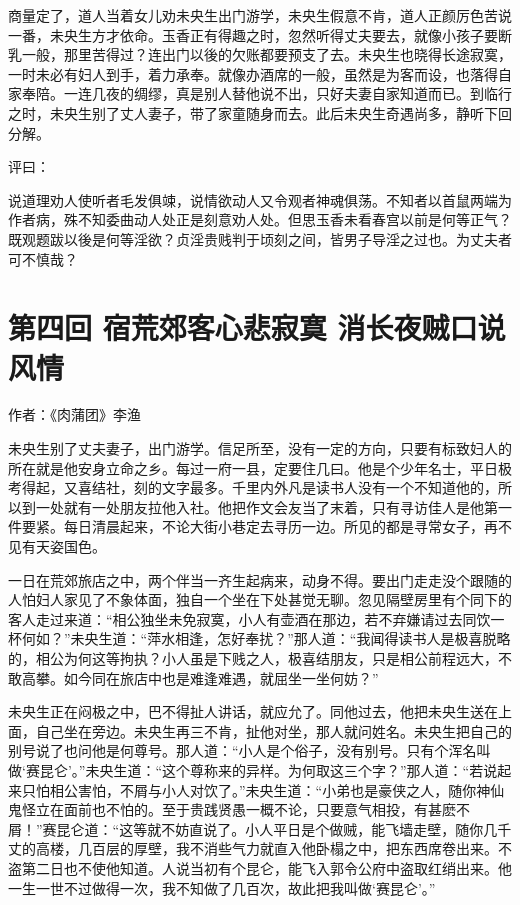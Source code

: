 \documentclass[a4paper,12pt,UTF8,twoside]{ctexbook}
\begin{document}
商量定了，道人当着女儿劝未央生出门游学，未央生假意不肯，道人正颜厉色苦说一番，未央生方才依命。玉香正有得趣之时，忽然听得丈夫要去，就像小孩子要断乳一般，那里苦得过？连出门以後的欠账都要预支了去。未央生也晓得长途寂寞，一时未必有妇人到手，着力承奉。就像办酒席的一般，虽然是为客而设，也落得自家奉陪。一连几夜的绸缪，真是别人替他说不出，只好夫妻自家知道而已。到临行之时，未央生别了丈人妻子，带了家童随身而去。此后未央生奇遇尚多，静听下回分解。

评曰：

说道理劝人使听者毛发俱竦，说情欲动人又令观者神魂俱荡。不知者以首鼠两端为作者病，殊不知委曲动人处正是刻意劝人处。但思玉香未看春宫以前是何等正气？既观题跋以後是何等淫欲？贞淫贵贱判于顷刻之间，皆男子导淫之过也。为丈夫者可不慎哉？

\chapter{第四回 宿荒郊客心悲寂寞 消长夜贼口说风情}

作者：《肉蒲团》李渔

未央生别了丈夫妻子，出门游学。信足所至，没有一定的方向，只要有标致妇人的所在就是他安身立命之乡。每过一府一县，定要住几曰。他是个少年名士，平日极考得起，又喜结社，刻的文字最多。千里内外凡是读书人没有一个不知道他的，所以到一处就有一处朋友拉他入社。他把作文会友当了末着，只有寻访佳人是他第一件要紧。每日清晨起来，不论大街小巷定去寻历一边。所见的都是寻常女子，再不见有天姿国色。

一日在荒郊旅店之中，两个伴当一齐生起病来，动身不得。要出门走走没个跟随的人怕妇人家见了不象体面，独自一个坐在下处甚觉无聊。忽见隔壁房里有个同下的客人走过来道：“相公独坐未免寂寞，小人有壶酒在那边，若不弃嫌请过去同饮一杯何如？”未央生道：“萍水相逢，怎好奉扰？”那人道：“我闻得读书人是极喜脱略的，相公为何这等拘执？小人虽是下贱之人，极喜结朋友，只是相公前程远大，不敢高攀。如今同在旅店中也是难逢难遇，就屈坐一坐何妨？”

未央生正在闷极之中，巴不得扯人讲话，就应允了。同他过去，他把未央生送在上面，自己坐在旁边。未央生再三不肯，扯他对坐，那人就问姓名。未央生把自己的别号说了也问他是何尊号。那人道：“小人是个俗子，没有别号。只有个浑名叫做‘赛昆仑’。”未央生道：“这个尊称来的异样。为何取这三个字？”那人道：“若说起来只怕相公害怕，不屑与小人对饮了。”未央生道：“小弟也是豪侠之人，随你神仙鬼怪立在面前也不怕的。至于贵践贤愚一概不论，只要意气相投，有甚麽不屑！”赛昆仑道：“这等就不妨直说了。小人平日是个做贼，能飞墙走壁，随你几千丈的高楼，几百层的厚壁，我不消些气力就直入他卧榻之中，把东西席卷出来。不盗第二日也不使他知道。人说当初有个昆仑，能飞入郭令公府中盗取红绡出来。他一生一世不过做得一次，我不知做了几百次，故此把我叫做‘赛昆仑’。”
\end{document}
